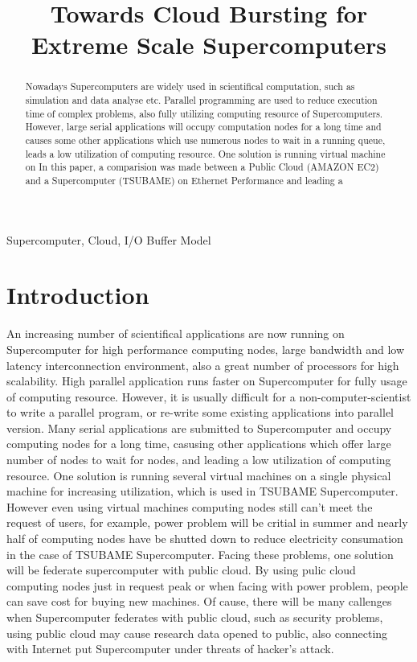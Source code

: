 \documentclass[JIP,draft]{ipsj}
\begin{document}
\title{Towards Cloud Bursting for Extreme Scale Supercomputers}

\begin{abstract}
Nowadays Supercomputers are widely used in scientifical computation, such as simulation and data analyse etc. 
Parallel programming are used to reduce execution time of complex problems, also fully utilizing computing resource of Supercomputers.
However, large serial applications will occupy computation nodes for a long time and causes some other applications which use numerous nodes to wait in a running queue, leads a low utilization of computing resource.
One solution is running virtual machine on 
In this paper, a comparision was made between a Public Cloud (AMAZON EC2) and a Supercomputer (TSUBAME) on Ethernet Performance and leading a 
\end{abstract}

\begin{keyword}
Supercomputer, Cloud, I/O Buffer Model
\end{keyword}

\maketitle

\section{Introduction}
An increasing number of scientifical applications are now running on Supercomputer for high performance computing nodes, large bandwidth and low latency interconnection environment, also a great number of processors for high scalability.
High parallel application runs faster on Supercomputer for fully usage of computing resource.
However, it is usually difficult for a non-computer-scientist to write a parallel program, or re-write some existing applications into parallel version.
Many serial applications are submitted to Supercomputer and occupy computing nodes for a long time, casusing other applications which offer large number of nodes to wait for nodes, and leading a low utilization of computing resource.
One solution is running several virtual machines on a single physical machine for increasing utilization, which is used in TSUBAME Supercomputer.
However even using virtual machines computing nodes still can't meet the request of users, for example, power problem will be critial in summer and nearly half of computing nodes have be shutted down to reduce electricity consumation in the case of TSUBAME Supercomputer. 
Facing these problems, one solution will be federate supercomputer with public cloud.
By using pulic cloud computing nodes just in request peak or when facing with power problem, people can save cost for buying new machines.
Of cause, there will be many callenges when Supercomputer federates with public cloud, such as security problems, using public cloud may cause research data opened to public, also connecting with Internet put Supercomputer under threats of hacker's attack.
\end{document}
